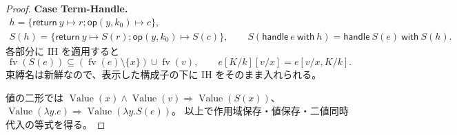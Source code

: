 \documentclass[a4paper,11pt]{article}
\theoremstyle{definition}
\newenvironment{Case}[1]{\par\smallskip\noindent\textbf{Case #1.}\enspace\ignorespaces}{\par}
\newcommand{\FV}{\operatorname{fv}}
\newcommand{\op}{\mathsf{op}}
\newcommand{\handle}[2]{\mathsf{handle}\ #1\ \mathsf{with}\ #2}
\newcommand{\Val}{\operatorname{Value}}
\begin{document}
\begin{proof}
\begin{Case}{Term-Handle}
\begin{gather*}
 h=\{\mathsf{return}\ y\mapsto r;\op(y,k_0)\mapsto c\},\\
 S(h)=\{\mathsf{return}\ y\mapsto S(r);\op(y,k_0)\mapsto S(c)\},\qquad
 S(\handle e h)=\handle{S(e)}{S(h)}.
\end{gather*}
各部分に IH を適用すると
\[
 \FV(S(e))\subseteq(\FV(e)\setminus\{x\})\cup\FV(v),\qquad
 e[K/k][v/x]=e[v/x,K/k].
\]
束縛名は新鮮なので、表示した構成子の下に IH をそのまま入れられる。
\end{Case}
値の二形では
$\Val(x)\land\Val(v)\Rightarrow\Val(S(x))$、
$\Val(\lambda y.e)\Rightarrow\Val(\lambda y.S(e))$。
以上で作用域保存・値保存・二値同時代入の等式を得る。
\end{proof}
\end{document}
